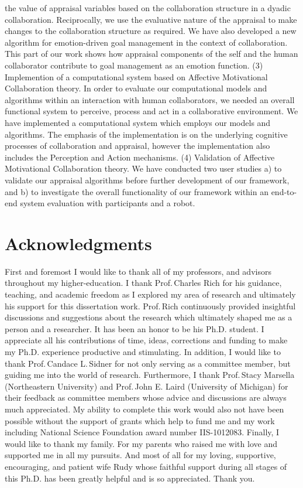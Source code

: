 \documentclass[12pt]{report}
\begin{document}
the value of appraisal variables based on the collaboration structure in a
dyadic collaboration. Reciprocally, we use the evaluative nature of the
appraisal to make changes to the collaboration structure as required. We have
also developed a new algorithm for emotion-driven goal management in the context
of collaboration. This part of our work shows how appraisal components of the
self and the human collaborator contribute to goal management as an emotion
function. (3) Implemention of a computational system based on Affective
Motivational Collaboration theory. In order to evaluate our computational models
and algorithms within an interaction with human collaborators, we needed an
overall functional system to perceive, process and act in a collaborative
environment. We have implemented a computational system which employs our models
and algorithms. The emphasis of the implementation is on the underlying cognitive
processes of collaboration and appraisal, however the implementation also
includes the Perception and Action mechanisms. (4) Validation of Affective
Motivational Collaboration theory. We have conducted two user studies a) to
validate our appraisal algorithms before further development of our framework,
and b) to investigate the overall functionality of our framework within an
end-to-end system evaluation with participants and a robot.

\pagebreak

\chapter*{Acknowledgments}
First and foremost I would like to thank all of my professors, and advisors
throughout my higher-education. I thank Prof.\,Charles Rich for his guidance,
teaching, and academic freedom as I explored my area of research and ultimately
his support for this dissertation work. Prof.\,Rich continuously provided
insightful discussions and suggestions about the research which ultimately
shaped me as a person and a researcher. It has been an honor to be his Ph.D.
student. I appreciate all his contributions of time, ideas, corrections and
funding to make my Ph.D. experience productive and stimulating. In addition, I
would like to thank Prof.\,Candace L.\,Sidner for not only serving as a
committee member, but guiding me into the world of research. Furthermore, I
thank Prof.\,Stacy Marsella (Northeastern University) and Prof.\,John E. Laird
(University of Michigan) for their feedback as committee members whose advice
and discussions are always much appreciated. My ability to complete this work
would also not have been possible without the support of grants which help to
fund me and my work including National Science Foundation award number
IIS-1012083. Finally, I would like to thank my family. For my parents who raised
me with love and supported me in all my pursuits. And most of all for my loving,
supportive, encouraging, and patient wife Rudy whose faithful support during all
stages of this Ph.D. has been greatly helpful and is so appreciated. Thank you.
\end{document}
